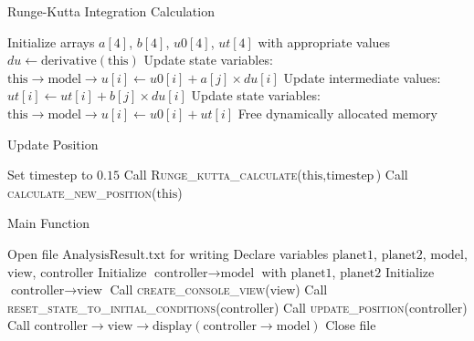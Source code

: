 \documentclass{article}
\begin{document}
\begin{algorithm}
\caption{Runge-Kutta Integration Calculation}
\begin{algorithmic}[1]
    \State Initialize arrays $a[4]$, $b[4]$, $u0[4]$, $ut[4]$ with appropriate values
        \State $du \gets \text{derivative}(\text{this})$
            \State Update state variables: $\text{this} \rightarrow \text{model} \rightarrow u[i] \gets u0[i] + a[j] \times du[i]$
            \State Update intermediate values: $ut[i] \gets ut[i] + b[j] \times du[i]$
        \EndFor
    \EndFor
        \State Update state variables: $\text{this} \rightarrow \text{model} \rightarrow u[i] \gets u0[i] + ut[i]$
    \EndFor
    \State Free dynamically allocated memory
\EndFunction
\end{algorithmic}
\end{algorithm}

\begin{algorithm}
\caption{Update Position}
\begin{algorithmic}[1]
    \State Set $\text{timestep}$ to $0.15$
    \State Call \textsc{Runge\_kutta\_calculate}($\text{this}, \text{timestep}$)
    \State Call \textsc{calculate\_new\_position}($\text{this}$)
\EndFunction
\end{algorithmic}
\end{algorithm}

\begin{algorithm}
\caption{Main Function}
\begin{algorithmic}[1]
    \State Open file $\text{AnalysisResult.txt}$ for writing
    \State Declare variables $\text{planet1}$, $\text{planet2}$, $\text{model}$, $\text{view}$, $\text{controller}$
    \State Initialize $\text{controller} \rightarrow \text{model}$ with $\text{planet1}$, $\text{planet2}$
    \State Initialize $\text{controller} \rightarrow \text{view}$
    \State Call \textsc{create\_console\_view}($\text{view}$)
    \State Call \textsc{reset\_state\_to\_initial\_conditions}($\text{controller}$)
        \State Call \textsc{update\_position}($\text{controller}$)
        \State Call $\text{controller} \rightarrow \text{view} \rightarrow \text{display}(\text{controller} \rightarrow \text{model})$
    \EndFor
    \State Close file
\EndFunction
\end{algorithmic}
\end{algorithm}
\end{document}
